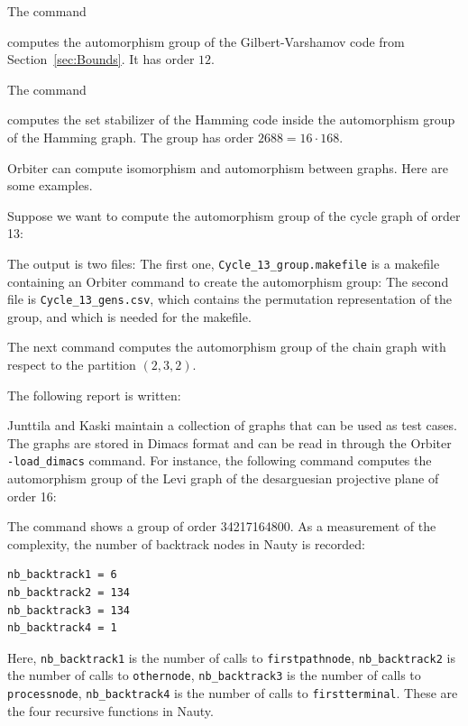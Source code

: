 \bigskip


The command 
{\tt

}
computes the automorphism group of the Gilbert-Varshamov code from Section~\ref{sec:Bounds}. 
It has order $12$.

\bigskip

The command
{\tt

}
{\tt

}
computes the set stabilizer of the Hamming code inside the automorphism group of the Hamming graph. 
The group has order $2688 = 16 \cdot 168$.

\bigskip
Orbiter can compute isomorphism and automorphism between graphs. 
Here are some examples.


\bigskip


Suppose we want to compute the automorphism group of the cycle graph of order 13:
{\tt

}
The output is two files: The first one, \verb'Cycle_13_group.makefile' is a makefile containing an Orbiter command to 
create the automorphism group:
The second file is \verb'Cycle_13_gens.csv', which contains the permutation representation of the group, and which is needed 
for the makefile.


\bigskip


The next command computes the automorphism group of the chain graph with respect to the partition $(2,3,2)$.
{\tt

}
The following report is written:
\begin{mdframed}[style=MyFrame]

\end{mdframed}




\bigskip

Junttila and Kaski maintain a collection of graphs that can be used as test cases.
The graphs are stored in Dimacs format and can be read in through 
the Orbiter \verb'-load_dimacs' command. 
For instance, the following command 
computes the automorphism group of the 
Levi graph of the desarguesian projective plane of order 16:
{\tt

}
The command shows a group of order 34217164800. 
As a measurement of the complexity, 
the number of backtrack nodes in Nauty is recorded:
\begin{verbatim}
nb_backtrack1 = 6
nb_backtrack2 = 134
nb_backtrack3 = 134
nb_backtrack4 = 1
\end{verbatim}
Here, 
\verb'nb_backtrack1' is the number of calls to \verb'firstpathnode', 
\verb'nb_backtrack2' is the number of calls to \verb'othernode', 
\verb'nb_backtrack3' is the number of calls to \verb'processnode', 
\verb'nb_backtrack4' is the number of calls to \verb'firstterminal'.
These are the four recursive functions in Nauty.

